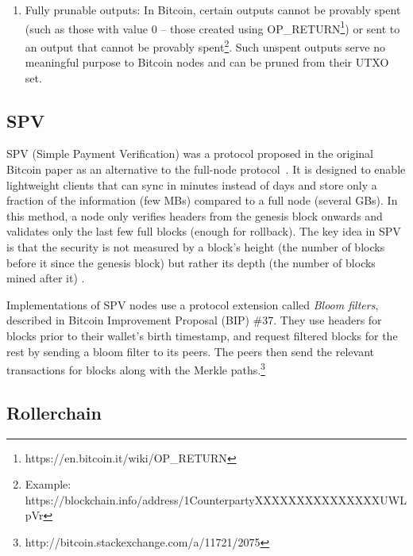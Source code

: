 \documentclass[]{report}   %
\newcommand{\authnote}[2]{\marginpar{\parbox{\marginparwidth}{\tiny %
  \textsf{#1 {\textcolor{blue}{notes: #2}}}}}%
  \textcolor{blue}{\textbf{\dag}}}
\newcommand{\authnote}[2]{
  \textsf{#1 \textcolor{blue}{: #2}}}
\newcommand{\authnote}[2]{}
\newcommand{\knote}[1]{{\authnote{\textcolor{green}{Alex notes}}{#1}}}
\begin{document}
\begin{enumerate}
	\item Fully prunable outputs: In Bitcoin, certain outputs cannot be provably spent (such as those with value 0 -- those created using OP\_RETURN\footnote{https://en.bitcoin.it/wiki/OP\_RETURN}) or sent to an output that cannot be provably spent\footnote{Example: https://blockchain.info/address/1CounterpartyXXXXXXXXXXXXXXXUWLpVr}. Such unspent outputs serve no meaningful purpose to Bitcoin nodes and can be pruned from their UTXO set. 
\end{enumerate}




\subsection{SPV}

SPV (Simple Payment Verification) was a protocol proposed in the original Bitcoin paper as an alternative to the full-node protocol~\cite{Nakamoto2008}. It is designed to enable lightweight clients that can sync in minutes instead of days and store only a fraction of the information (few MBs) compared to a full node (several GBs).
In this method, a node only verifies headers from the genesis block onwards and validates only the last few full blocks (enough for rollback). 
The key idea in SPV is that the security is not measured by a block's height (the number of blocks before it since the genesis block) but rather its depth (the number of blocks mined after it) \knote{???}. 

Implementations of SPV nodes use a protocol extension called {\em Bloom filters}, described in Bitcoin Improvement Proposal (BIP) \#37. They use headers for blocks prior to their wallet's birth timestamp, and request filtered blocks for the rest by sending a bloom filter to its peers. The peers then send the relevant transactions for blocks along with the Merkle paths.\footnote{http://bitcoin.stackexchange.com/a/11721/2075}

\subsection{Rollerchain}
\end{document}
